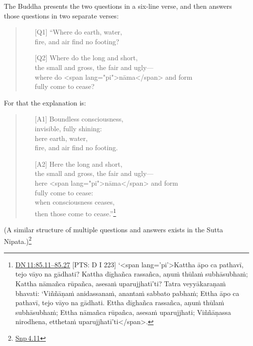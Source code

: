 \documentclass[10pt, openright]{book}
\begin{document}
The Buddha presents the two questions in a six-line verse, and then answers those questions in two separate verses:


\begin{quote}


\begin{itemize}

\item[{[Q1]}]“Where do earth, water, \\ fire, and air find no footing?


\item[{[Q2]}]Where do the long and short, \\ the small and gross, the fair and ugly— \\ where do <span lang="pi">nāma</span> and form \\ fully come to cease?

\end{itemize}

\end{quote}
For that the explanation is:


\begin{quote}


\begin{itemize}

\item[{[A1]}]Boundless consciousness, \\ invisible, fully shining: \\ here earth, water, \\ fire, and air find no footing.


\item[{[A2]}]Here the long and short, \\ the small and gross, the fair and ugly— \\ here <span lang="pi">nāma</span> and form \\ fully come to cease: \\ when consciousness ceases, \\ then those come to cease.”\footnote {\href{https://suttacentral.net/dn11/en/sujato\#85.11}{DN 11:85.11–85.27} [PTS: D I 223] ‘<span lang='pi'>Kattha āpo ca pathavī, tejo vāyo na gādhati? Kattha dīghañca rassañca, aṇuṁ thūlaṁ subhāsubhaṁ; Kattha nāmañca rūpañca, asesaṁ uparujjhatī’ti? Tatra veyyākaraṇaṁ bhavati: ‘Viññāṇaṁ anidassanaṁ, anantaṁ sabbato pabhaṁ; Ettha āpo ca pathavī, tejo vāyo na gādhati. Ettha dīghañca rassañca, aṇuṁ thūlaṁ subhāsubhaṁ; Ettha nāmañca rūpañca, asesaṁ uparujjhati; Viññāṇassa nirodhena, etthetaṁ uparujjhatī’ti</span>.}

\end{itemize}

\end{quote}
(A similar structure of multiple questions and answers exists in the Sutta Nipata.)\footnote {\href{https://suttacentral.net/snp4.11/en/sujato}{Snp 4.11}}
\end{document}
